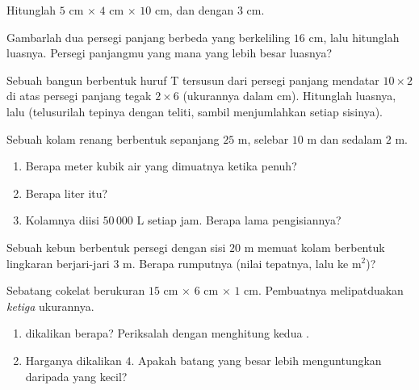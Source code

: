 \begin{exercise}[$\star$]\label{exo:g6:measure:7}
Hitunglah   $5$ cm $\times$ $4$ cm $\times$ $10$ cm, dan
  dengan  $3$ cm.
\end{exercise}

\begin{exercise}[$\star$]\label{exo:g6:measure:8}
Gambarlah dua persegi panjang berbeda yang berkeliling $16$ cm, lalu
hitunglah luasnya. Persegi panjangmu yang mana yang lebih besar luasnya?
\end{exercise}

\begin{exercise}[$\star\star$]\label{exo:g6:measure:9}
Sebuah bangun berbentuk huruf T tersusun dari persegi panjang mendatar
$10 \times 2$ di atas persegi panjang tegak $2 \times 6$ (ukurannya
dalam cm). Hitunglah luasnya, lalu  (telusurilah tepinya
dengan teliti, sambil menjumlahkan setiap sisinya).
\end{exercise}

\begin{exercise}[$\star\star$]\label{exo:g6:measure:10}
Sebuah kolam renang berbentuk  sepanjang $25$ m, selebar $10$ m
dan sedalam $2$ m.
\begin{enumerate}
  \item Berapa meter kubik air yang dimuatnya ketika penuh?
  \item Berapa liter itu?
  \item Kolamnya diisi $50\,000$ L setiap jam. Berapa lama pengisiannya?
\end{enumerate}
\end{exercise}

\begin{exercise}[$\star\star$]\label{exo:g6:measure:11}
Sebuah kebun berbentuk persegi dengan sisi $20$ m memuat kolam
berbentuk lingkaran berjari-jari $3$ m. Berapa  rumputnya (nilai
tepatnya, lalu  ke m$^2$)?
\end{exercise}

\begin{exercise}[$\star\star\star$]\label{exo:g6:measure:12}
Sebatang cokelat berukuran $15$ cm $\times$ $6$ cm $\times$ $1$ cm.
Pembuatnya melipatduakan \emph{ketiga} ukurannya.
\begin{enumerate}
  \item {} dikalikan berapa? Periksalah dengan menghitung kedua
        .
  \item Harganya dikalikan $4$. Apakah batang yang besar lebih
        menguntungkan daripada yang kecil?
\end{enumerate}
\end{exercise}

